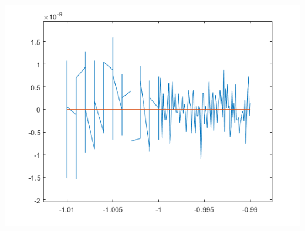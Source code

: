 \documentclass[12pt,letterpaper]{article}
\begin{document}
\begin{enumerate}
        \includegraphics{number4graph.png}\\
        
    \end{enumerate}
\end{document}
